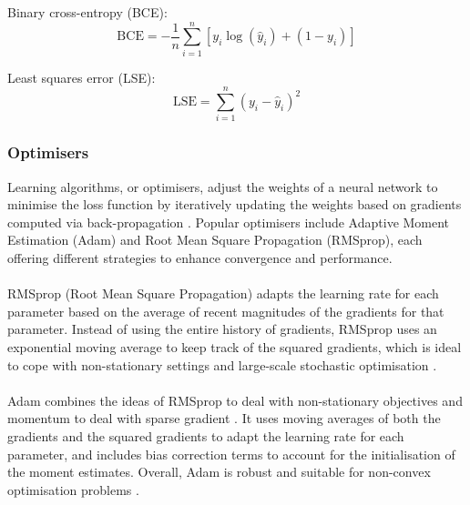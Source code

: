 \begin{minipage}{0.5\textwidth}
	Binary cross-entropy (BCE):
	\begin{equation}
		\mathrm{BCE}=-\frac{1}{n} \sum_{i=1}^n\left[y_i \log \left(\hat{y}_i\right)+\left(1-y_i\right)\right]
		\label{eq:bce_loss}
	\end{equation}
\end{minipage}%
\begin{minipage}{0.5\textwidth}
	Least squares error (LSE):
	\begin{equation}
		\mathrm{LSE}=\sum_{i=1}^n\left(y_i-\hat{y}_i\right)^2
		\label{eq:lse_loss}
	\end{equation}
\end{minipage}

\subsubsection{Optimisers}
Learning algorithms, or optimisers, adjust the weights of a neural network to minimise the loss function by iteratively updating the weights based on gradients computed via back-propagation \cite{shrestha2019review}. Popular optimisers include Adaptive Moment Estimation (Adam) and Root Mean Square Propagation (RMSprop), each offering different strategies to enhance convergence and performance.
\\\\
RMSprop (Root Mean Square Propagation) adapts the learning rate for each parameter based on the average of recent magnitudes of the gradients for that parameter. Instead of using the entire history of gradients, RMSprop uses an exponential moving average to keep track of the squared gradients, which is ideal to cope with non-stationary settings and large-scale stochastic optimisation \cite{zou2019sufficient}. 
\\\\
Adam combines the ideas of RMSprop to deal with non-stationary objectives and momentum to deal with sparse gradient \cite{kingma2014adam}. It uses moving averages of both the gradients and the squared gradients to adapt the learning rate for each parameter, and includes bias correction terms to account for the initialisation of the moment estimates. Overall, Adam is robust and suitable for non-convex optimisation problems \cite{kingma2014adam}.



